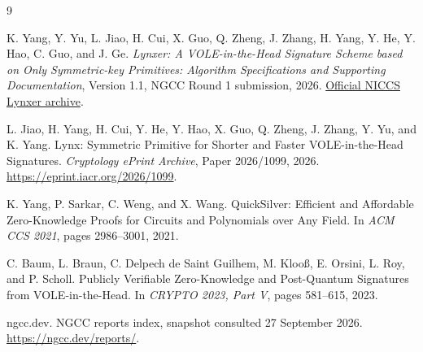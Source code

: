 \documentclass[11pt,a4paper]{article}
\begin{document}
\begin{thebibliography}{9}

K. Yang, Y. Yu, L. Jiao, H. Cui, X. Guo, Q. Zheng, J. Zhang, H. Yang, Y. He,
Y. Hao, C. Guo, and J. Ge.
\newblock \emph{Lynxer: A VOLE-in-the-Head Signature Scheme based on Only
Symmetric-key Primitives: Algorithm Specifications and Supporting Documentation},
Version 1.1, NGCC Round 1 submission, 2026.
\newblock \href{https://www.niccs.org.cn/niccs/Proposal/Public-Key\%20Cryptographic\%20Algorithms/Round\%201\%20candidates/Lynxer.zip}
{Official NICCS Lynxer archive}.

L. Jiao, H. Yang, H. Cui, Y. He, Y. Hao, X. Guo, Q. Zheng, J. Zhang, Y. Yu,
and K. Yang.
\newblock Lynx: Symmetric Primitive for Shorter and Faster VOLE-in-the-Head
Signatures.
\newblock \emph{Cryptology ePrint Archive}, Paper 2026/1099, 2026.
\newblock \url{https://eprint.iacr.org/2026/1099}.

K. Yang, P. Sarkar, C. Weng, and X. Wang.
\newblock QuickSilver: Efficient and Affordable Zero-Knowledge Proofs for Circuits
and Polynomials over Any Field.
\newblock In \emph{ACM CCS 2021}, pages 2986--3001, 2021.

C. Baum, L. Braun, C. Delpech de Saint Guilhem, M. Kloo{\ss}, E. Orsini,
L. Roy, and P. Scholl.
\newblock Publicly Verifiable Zero-Knowledge and Post-Quantum Signatures from
VOLE-in-the-Head.
\newblock In \emph{CRYPTO 2023, Part V}, pages 581--615, 2023.

ngcc.dev.
\newblock NGCC reports index, snapshot consulted 27 September 2026.
\newblock \url{https://ngcc.dev/reports/}.

\end{thebibliography}
\end{document}
